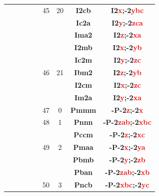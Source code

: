 \documentclass{article}      %
\begin{document}
\begin{small}
\begin{longtable}[c]{|c|c|c|c|c|c|c|c|c|}
	  &  & & & &\textrm{45}  &\textrm{20} &\textbf{I2cb}         &\textbf{I2\textcolor{red}{x};-2\textcolor{red}{ybc}}\\\cline{8-9}         
          &  & & & &  & &\textbf{Ic2a}         &\textbf{I2\textcolor{red}{y};-2\textcolor{red}{zca}}\\\cline{8-9}         
          &  & & & &  & &\textbf{Ima2}         &\textbf{I2\textcolor{red}{z};-2\textcolor{red}{xa}}\\\cline{6-9}          
          &  & & & &  & &\textbf{I2mb}         &\textbf{I2\textcolor{red}{x};-2\textcolor{red}{yb}}\\\cline{8-9}          
          &  & & & & & &\textbf{Ic2m}         &\textbf{I2\textcolor{red}{y};-2\textcolor{red}{zc}}\\\cline{8-9}          
	  &  & & & &\textrm{46}  &\textrm{21} &\textbf{Ibm2}         &\textbf{I2\textcolor{red}{z};-2\textcolor{red}{yb}}\\\cline{8-9}          
          &  & & & &  & &\textbf{I2cm}         &\textbf{I2\textcolor{red}{x};-2\textcolor{red}{zc}}\\\cline{8-9}          
          &  & & & &  & &\textbf{Im2a}         &\textbf{I2\textcolor{red}{y};-2\textcolor{red}{xa}}\\\cline{2-9}          
	  &  & & & &\textrm{47}  &\textrm{0} &\textbf{Pmmm}         &\textbf{-P-2\textcolor{red}{z};-2\textcolor{red}{x}}\\\cline{6-9}         
 	  &  & & & &\textrm{48}  &\textrm{1} &\textbf{Pnnn}         &\textbf{-P-2\textcolor{red}{zab};-2\textcolor{red}{xbc}}\\\cline{6-9}     
          &  & & & &  & &\textbf{Pccm}         &\textbf{-P-2\textcolor{red}{z};-2\textcolor{red}{xc}}\\\cline{8-9}        
	  &  & & & &\textrm{49}  &\textrm{2} &\textbf{Pmaa}         &\textbf{-P-2\textcolor{red}{x};-2\textcolor{red}{ya}}\\\cline{8-9}        
          &  & & & &  & &\textbf{Pbmb}         &\textbf{-P-2\textcolor{red}{y};-2\textcolor{red}{zb}}\\\cline{6-9}        
          &  & & & &  & &\textbf{Pban}         &\textbf{-P-2\textcolor{red}{zab};-2\textcolor{red}{xb}}\\\cline{8-9}      
	  &  & & & &\textrm{50}  &\textrm{3} &\textbf{Pncb}         &\textbf{-P-2\textcolor{red}{xbc};-2\textcolor{red}{yc}}\\\cline{8-9}      

\end{longtable}
\end{small}
\end{document}
